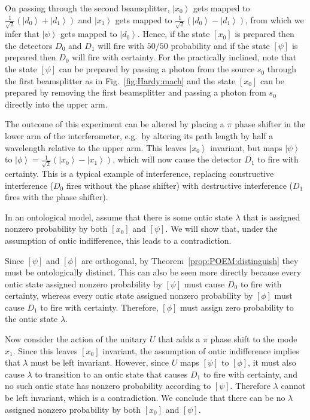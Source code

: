 \documentclass[DIV=calc,fontsize=12pt]{scrartcl} %
\theoremstyle{definition}
\theoremstyle{plain}
\newcommand{\Ket}[1]{\ensuremath{\left \vert #1 \right \rangle}}
\newcommand{\Proj}[1]{\ensuremath{\left [ #1 \right ]}}
\begin{document}
On passing through the second beamsplitter, $\Ket{x_0}$ gets mapped to
$\frac{1}{\sqrt{2}} \left ( \Ket{d_0} + \Ket{d_1} \right )$ and
$\Ket{x_1}$ gets mapped to $\frac{1}{\sqrt{2}} \left ( \Ket{d_0} -
\Ket{d_1} \right )$, from which we infer that $\Ket{\psi}$ gets
mapped to $\Ket{d_0}$.  Hence, if the state $\Proj{x_0}$ is prepared
then the detectors $D_0$ and $D_1$ will fire with $50/50$ probability
and if the state $\Proj{\psi}$ is prepared then $D_0$ will fire with
certainty.  For the practically inclined, note that the state
$\Proj{\psi}$ can be prepared by passing a photon from the source
$s_0$ through the first beamsplitter as in Fig.~\ref{fig:Hardy:mach}
and the state $\Proj{x_0}$ can be prepared by removing the first
beamsplitter and passing a photon from $s_0$ directly into the upper
arm.

The outcome of this experiment can be altered by placing a $\pi$ phase
shifter in the lower arm of the interferometer, e.g.\ by altering its
path length by half a wavelength relative to the upper arm.  This
leaves $\Ket{x_0}$ invariant, but maps $\Ket{\psi}$ to $\Ket{\phi} =
\frac{1}{\sqrt{2}} \left ( \Ket{x_0} - \Ket{x_1} \right )$, which will
now cause the detector $D_1$ to fire with certainty.  This is a
typical example of interference, replacing constructive interference
($D_0$ fires without the phase shifter) with destructive interference
($D_1$ fires with the phase shifter).

In an ontological model, assume that there is some ontic state
$\lambda$ that is assigned nonzero probability by both $\Proj{x_0}$
and $\Proj{\psi}$.  We will show that, under the assumption of ontic
indifference, this leads to a contradiction.

Since $\Proj{\psi}$ and $\Proj{\phi}$ are orthogonal, by
Theorem~\ref{prop:POEM:distinguish} they must be ontologically
distinct.  This can also be seen more directly because every ontic
state assigned nonzero probability by $\Proj{\psi}$ must cause $D_0$
to fire with certainty, whereas every ontic state assigned nonzero
probability by $\Proj{\phi}$ must cause $D_1$ to fire with certainty.
Therefore, $\Proj{\phi}$ must assign zero probability to the ontic
state $\lambda$.

Now consider the action of the unitary $U$ that adds a $\pi$ phase
shift to the mode $x_1$.  Since this leaves $\Proj{x_0}$ invariant, the
assumption of ontic indifference implies that $\lambda$ must be left
invariant.  However, since $U$ maps $\Proj{\psi}$ to $\Proj{\phi}$, it
must also cause $\lambda$ to transition to an ontic state that causes
$D_1$ to fire with certainty, and no such ontic state has nonzero
probability according to $\Proj{\psi}$.  Therefore $\lambda$ cannot be
left invariant, which is a contradiction.  We conclude that there can
be no $\lambda$ assigned nonzero probability by both $\Proj{x_0}$ and
$\Proj{\psi}$.
\end{document}
